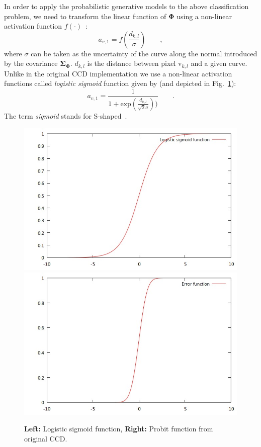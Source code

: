 \documentclass[conference]{IEEEtran}
\begin{document}
In order to apply the probabilistic generative models to the
above classification problem,
we need to transform the linear function of $\mathbf{\Phi}$ using a
non-linear activation function $f(\cdot)$~\cite{bishop2006pattern}:
\begin{equation}
  \label{eq:nonla}
  a_{v,1} = f(\frac{d_{k,l}}{\sigma})\qquad,
\end{equation}
where $\sigma$
can be taken as the uncertainty of the curve along the normal
introduced by the covariance $\mathbf{\Sigma}_{\mathbf{\Phi}}$. 
$d_{k,l}$ is the distance  between pixel  $\mathrm{v}_{k,l}$ and a given curve.
Unlike in the original CCD implementation we use a non-linear activation functions
called \textit{logistic sigmoid} function given by (and depicted in Fig.~\ref{fig:s-shaped}):
\begin{equation}
  \label{eq:logistic}
  a_{v,1} =
  \frac{1}{1+\mathrm{exp}(\frac{d_{k,l}}{\sqrt{2}\sigma}))}\qquad .
\end{equation}
The term \textit{sigmoid} stands for S-shaped~\cite{bishop2006pattern}. 
\begin{figure} 
    \centering 
    \includegraphics[width=0.48\columnwidth]{logistic.jpg}
    \includegraphics[width=0.48\columnwidth]{erf.jpg}
    \caption{\textbf{Left:} Logistic
  sigmoid function, \textbf{Right:} Probit function from original CCD.}
\label{fig:s-shaped}
\end{figure}
\end{document}
